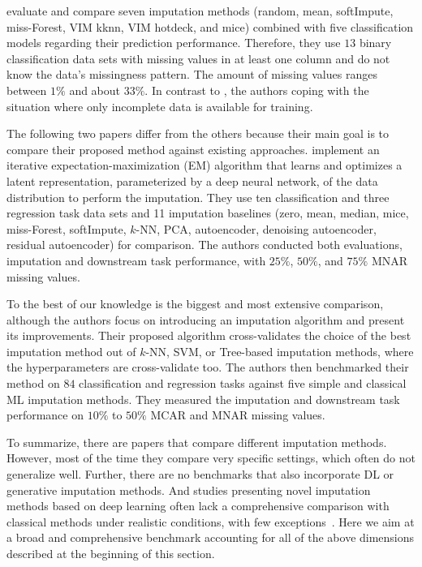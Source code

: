 \cite{Imputation_Benchmark_1} evaluate and compare seven imputation methods (random, mean, softImpute, miss-Forest, VIM kknn, VIM hotdeck, and mice) combined with five classification models regarding their prediction performance. Therefore,  they use $13$ binary classification data sets with missing values in at least one column and do not know the data's missingness pattern. The amount of missing values ranges between $1\%$ and about $33\%$. In contrast to \citep{Imputation_Benchmark_3, Imputation_Benchmark_2}, the authors coping with the situation where only incomplete data is available for training.

The following two papers differ from the others because their main goal is to compare their proposed method against existing approaches. \cite{Imputation_Benchmark_6} implement an iterative expectation-maximization (EM) algorithm that learns and optimizes a latent representation, parameterized by a deep neural network, of the data distribution to perform the imputation. They use ten classification and three regression task data sets and 11 imputation baselines (zero, mean, median, mice, miss-Forest, softImpute, $k$-NN, PCA, autoencoder, denoising autoencoder, residual autoencoder) for comparison. The authors conducted both evaluations, imputation and downstream task performance, with $25\%$, $50\%$, and $75\%$ MNAR missing values.

To the best of our knowledge \citep{Imputation_Benchmark_4} is the biggest and most extensive comparison, although the authors focus on introducing an imputation algorithm and present its improvements. Their proposed algorithm cross-validates the choice of the best imputation method out of $k$-NN, SVM, or Tree-based imputation methods, where the hyperparameters are cross-validate too. The authors then benchmarked their method on $84$ classification and regression tasks against five simple and classical ML imputation methods. They measured the imputation and downstream task performance on $10\%$ to $50\%$ MCAR and MNAR missing values.

To summarize, there are papers that compare different imputation methods. However, most of the time they compare very specific settings, which often do not generalize well. Further, there are no benchmarks that also incorporate DL or generative imputation methods. And studies presenting novel imputation methods based on deep learning often lack a comprehensive comparison with classical methods under realistic conditions, with few exceptions~\citep{Imputation_Benchmark_6}. Here we aim at a broad and comprehensive benchmark accounting for all of the above dimensions described at the beginning of this section.


